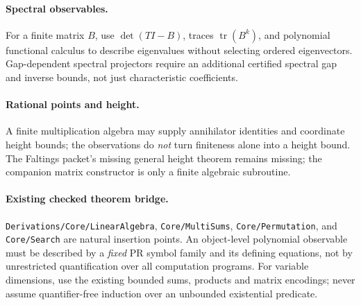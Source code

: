 \documentclass[11pt]{article}
\newcommand{\Tr}{\operatorname{tr}}\newcommand{\Res}{\operatorname{Res}}
\begin{document}
\paragraph{Spectral observables.} For a finite matrix \(B\), use \(\det(TI-B)\), traces \(\Tr(B^k)\), and polynomial functional calculus to describe eigenvalues without selecting ordered eigenvectors. Gap-dependent spectral projectors require an additional certified spectral gap and inverse bounds, not just characteristic coefficients.
\paragraph{Rational points and height.} A finite multiplication algebra may supply annihilator identities and coordinate height bounds; the observations do \emph{not} turn finiteness alone into a height bound. The Faltings packet's missing general height theorem remains missing; the companion matrix constructor is only a finite algebraic subroutine.
\paragraph{Existing checked theorem bridge.} \texttt{Derivations/Core/LinearAlgebra}, \texttt{Core/MultiSums}, \texttt{Core/Permutation}, and \texttt{Core/Search} are natural insertion points. An object-level polynomial observable must be described by a \emph{fixed} PR symbol family and its defining equations, not by unrestricted quantification over all computation programs. For variable dimensions, use the existing bounded sums, products and matrix encodings; never assume quantifier-free induction over an unbounded existential predicate.
\end{document}
